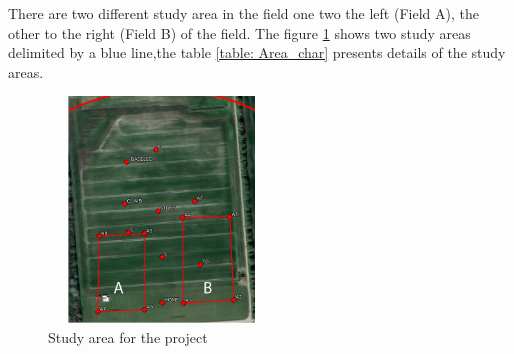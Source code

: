 There are two different study area in the field one two the left (Field A), the other to the right (Field B) of the field. The figure \ref{fig:Study area} shows two study areas delimited by a blue line,the table \ref{table: Area_char} presents details of the study areas.
\begin{figure}[H]
\centering
\includegraphics[width=6cm,height=6cm,keepaspectratio]{imagenes/Study_Area.png}
\caption{Study area for the project}
\label{fig:Study area}
\end{figure}

